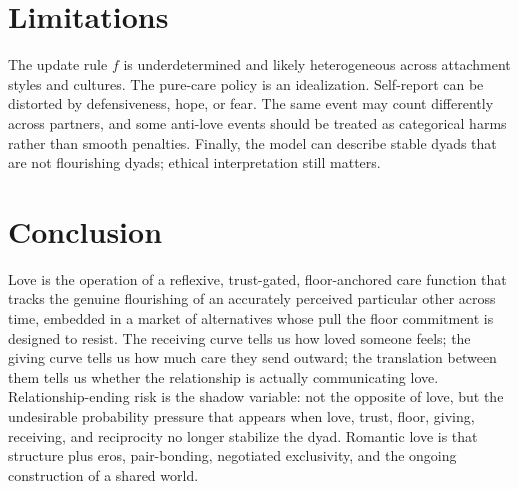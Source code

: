 \documentclass[11pt]{article}
\begin{document}
\section{Limitations}
The update rule $f$ is underdetermined and likely heterogeneous across attachment styles and cultures. The pure-care policy is an idealization. Self-report can be distorted by defensiveness, hope, or fear. The same event may count differently across partners, and some anti-love events should be treated as categorical harms rather than smooth penalties. Finally, the model can describe stable dyads that are not flourishing dyads; ethical interpretation still matters.

\section{Conclusion}
Love is the operation of a reflexive, trust-gated, floor-anchored care function that tracks the genuine flourishing of an accurately perceived particular other across time, embedded in a market of alternatives whose pull the floor commitment is designed to resist. The receiving curve tells us how loved someone feels; the giving curve tells us how much care they send outward; the translation between them tells us whether the relationship is actually communicating love. Relationship-ending risk is the shadow variable: not the opposite of love, but the undesirable probability pressure that appears when love, trust, floor, giving, receiving, and reciprocity no longer stabilize the dyad. Romantic love is that structure plus eros, pair-bonding, negotiated exclusivity, and the ongoing construction of a shared world.
\end{document}
